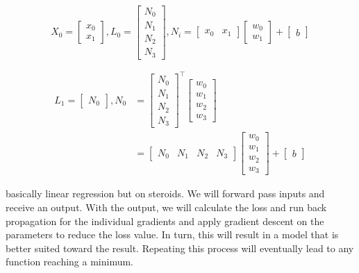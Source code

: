 \begin{equation*}
    X_0 = 
        \begin{bmatrix}
            x_0 \\
            x_1
        \end{bmatrix},
     L_0 = 
        \begin{bmatrix}
            N_0 \\
            N_1 \\
            N_2 \\
            N_3
        \end{bmatrix}, 
    N_i = 
        \begin{bmatrix}
            x_0 & x_1 
        \end{bmatrix}
        \begin{bmatrix}
            w_0 \\
            w_1
        \end{bmatrix} + 
        \begin{bmatrix}
            b
        \end{bmatrix}
\end{equation*}

\begin{align*}
    L_1 = 
        \begin{bmatrix}
            N_0
        \end{bmatrix},
    N_0 &= 
        \begin{bmatrix}
            N_0 \\
            N_1 \\
            N_2 \\
            N_3
        \end{bmatrix}^{\top}
        \begin{bmatrix}
            w_0 \\
            w_1 \\
            w_2 \\
            w_3
        \end{bmatrix} \\
        &=
        \begin{bmatrix}
            N_0 & N_1 & N_2 & N_3
        \end{bmatrix}
        \begin{bmatrix}
            w_0 \\
            w_1 \\
            w_2 \\
            w_3
        \end{bmatrix} + 
        \begin{bmatrix}
            b
        \end{bmatrix}
\end{align*}

basically linear regression but on steroids. 
We will forward pass inputs and receive an output. With the output, we will calculate the loss and
run back propagation for the individual gradients and apply gradient descent on the parameters to reduce the loss value.
In turn, this will result in a model that is better suited toward the result. Repeating this process will
eventually lead to any function reaching a minimum.